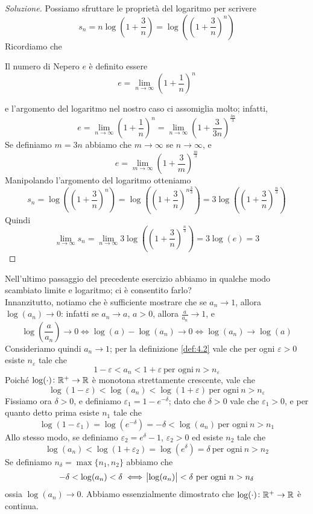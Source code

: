 \begin{proof}[Soluzione]
    Possiamo sfruttare le proprietà del logaritmo per scrivere
    \[
    s_n = n\log\left(1+\frac{3}{n}\right) =\log\left(\left(1+\frac{3}{n}\right)^n\right)
    \]
    Ricordiamo che
    \begin{tcolorbox}
        \begin{definition}
            \label{def:4.3}
            Il numero di Nepero $e$ è definito essere
            \[
            e = \lim_{n\to\infty}\left(1+\frac{1}{n}\right)^n
            \]
        \end{definition}
    \end{tcolorbox}
    e l'argomento del logaritmo nel nostro caso ci assomiglia molto; infatti,
    \[
    e = \lim_{n\to\infty} \left(1+\frac{1}{n}\right)^n = \lim_{n\to\infty} \left(1+\frac{3}{3n}\right)^\frac{3n}{3}
    \]
    Se definiamo $m= 3n$ abbiamo che $m\to \infty$ se $n\to\infty$, e
    \[
    e = \lim_{m\to\infty}\left(1+\frac{3}{m}\right)^\frac{m}{3}
    \]
    Manipolando l'argomento del logaritmo otteniamo
    \[
    s_n = \log\left(\left(1+\frac{3}{n}\right)^n\right) = \log\left(\left(1+\frac{3}{n}\right)^{n\frac{3}{3}}\right) = 3\log\left(\left(1+\frac{3}{n}\right)^{\frac{n}{3}}\right)
    \]
    Quindi
    \[
    \lim_{n\to \infty} s_n = \lim_{n\to\infty} 3 \log\left(\left(1+\frac{3}{n}\right)^{\frac{n}{3}}\right) = 3 \log(e) = 3
    \]
\end{proof}
\begin{remark}
    Nell'ultimo passaggio del precedente esercizio abbiamo in qualche modo scambiato limite e logaritmo; ci è consentito farlo?\\
    Innanzitutto, notiamo che è sufficiente mostrare che se $a_n \to 1$, allora $\log(a_n) \to 0$: infatti se $a_n \to a$, $a>0$, allora $\frac{a}{a_n}\to 1$, e 
    \[
    \log\left(\frac{a}{a_n}\right)\to 0 \iff \log(a)-\log(a_n) \to 0 \iff \log(a_n)\to \log(a)
    \]
    Consideriamo quindi $a_n \to 1$; per la definizione \ref{def:4.2} vale che per ogni $\varepsilon>0$ esiste $n_\varepsilon$ tale che
    \[
    1-\varepsilon < a_n < 1+\varepsilon \ \text{per ogni} \ n>n_\varepsilon
    \]
    Poiché $\log(\cdot) \colon \amsbb{R}^+\to\amsbb{R}$ è monotona strettamente crescente, vale che
    \[
    \log(1-\varepsilon) < \log(a_n) <\log(1+\varepsilon) \ \text{per ogni} \ n>n_\varepsilon
    \]
    Fissiamo ora $\delta>0$, e definiamo $\varepsilon_1 = 1-e^{-\delta}$; dato che $\delta>0$ vale che $\varepsilon_1>0$, e per quanto detto prima esiste $n_1$ tale che
    \[
    \log(1-\varepsilon_1) = \log(e^{-\delta}) = -\delta < \log(a_n) \ \text{per ogni} \ n>n_1
    \]
    Allo stesso modo, se definiamo $\varepsilon_2 = e^{\delta}-1$, $\varepsilon_2>0$ ed esiste $n_2$ tale che
    \[
    \log(a_n)<\log(1+\varepsilon_2) = \log(e^\delta) = \delta \ \text{per ogni} \ n>n_2
    \]
    Se definiamo $n_\delta = \max\{n_1, n_2\}$ abbiamo che
    \[
    -\delta < \log(a_n) < \delta \iff \abs{\log(a_n)}<\delta \ \text{per ogni} \ n>n_\delta
    \]
    ossia $\log(a_n)\to 0$. Abbiamo essenzialmente dimostrato che $\log(\cdot)\colon \amsbb{R}^+\to \amsbb{R}$ è continua.
\end{remark}
